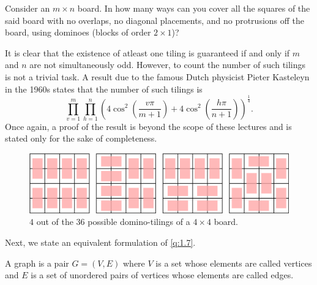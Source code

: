 \begin{question}
	\label{q:1.7}
Consider an $m\times n$ board. In how many ways can you cover all the squares of the said board with no overlaps, no diagonal placements, and no protrusions off the board, using dominoes (blocks of order $2\times 1$)?
\end{question}

It is clear that the existence of atleast one tiling is guaranteed if and only if $m$ and $n$ are not simultaneously odd. However, to count the number of such tilings is not a trivial task. A result due to the famous Dutch physicist Pieter Kasteleyn in the 1960s states that the number of such tilings is
\[
	\prod_{v=1}^{m}\prod_{h=1}^{n}\left( 4\cos^2\left( \frac{v\pi}{m+1} \right) +4\cos^2\left( \frac{h\pi}{n+1} \right)  \right)^{\frac{1}{4}}.
	\label{KFormula}
\]
Once again, a proof of the result is beyond the scope of these lectures and is stated only for the sake of completeness.
\begin{figure}[H]
    \centering
    \includegraphics[scale=0.6]{Images/Figure1.jpg}
    \caption{$4$ out of the $36$ possible domino-tilings of a $4\times 4$ board.}
\end{figure}

Next, we state an equivalent formulation of \cref{q:1.7}.

\begin{definition}[Graph]
A graph is a pair $G=\left( V,E \right)$ where $V$ is a set whose elements are called vertices and $E$ is a set of unordered pairs of vertices whose elements are called edges.
\label{d:1.2}
\end{definition}

